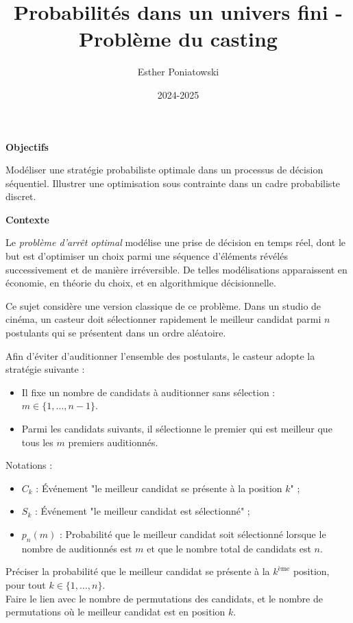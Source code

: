 \documentclass[10pt,a4paper]{article}
\title{Probabilités dans un univers fini - Problème du casting}
\author{Esther Poniatowski}
\date{2024-2025}
\begin{document}
\textbf{Objectifs}

Modéliser une stratégie probabiliste optimale dans un processus de décision séquentiel. Illustrer
une optimisation sous contrainte dans un cadre probabiliste discret.

\bigskip
\textbf{Contexte}

Le \textit{problème d'arrêt optimal}  modélise une prise de décision en temps réel, dont le but est
d'optimiser un choix parmi une séquence d'éléments révélés successivement et de manière
irréversible. De telles modélisations apparaissent en économie, en théorie du choix, et en
algorithmique décisionnelle.

\bigskip

Ce sujet considère une version classique de ce problème. Dans un studio de cinéma, un casteur doit
sélectionner rapidement le meilleur candidat parmi \( n \) postulants qui se présentent dans un
ordre aléatoire.

Afin d'éviter d'auditionner l'ensemble des postulants, le casteur adopte la stratégie suivante :
\begin{itemize}
 \item Il fixe un nombre de candidats à auditionner
  sans sélection : \( m \in \{1, \dots, n-1\} \).
 \item Parmi les candidats suivants, il sélectionne le premier qui est meilleur que tous les \( m \)
 premiers auditionnés.
\end{itemize}

\bigskip
Notations :
\begin{itemize}
 \item \( C_k \) : Événement "le meilleur candidat se présente à la position \( k \)" ;
 \item \( S_k \) : Événement "le meilleur candidat est sélectionné" ;
 \item \( p_n(m) \) : Probabilité que le meilleur candidat soit sélectionné lorsque le nombre de
  auditionnés est \( m \) et que le nombre total de candidats est \( n \).
\end{itemize}

\q Préciser la probabilité que le meilleur candidat se présente à la \( k^\text{ème} \) position,
pour tout \( k \in \{1, \dots, n\} \).\\ Faire le lien avec le nombre de permutations des candidats,
et le nombre de permutations où le meilleur candidat est en position \( k \).
\end{document}
